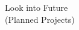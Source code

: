 \documentclass[preview]{standalone}
\begin{document}
\begin{center}
Look into Future\\(Planned Projects)
\end{center}
\end{document}
